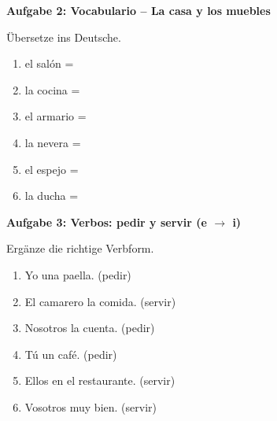 \documentclass[a4paper,11pt]{article}
\newcommand{\luecke}[1]{\underline{\hspace{#1}}}
\newcommand{\punktebox}[1]{\hfill\fbox{\small\textcolor{mittelgrau}{\_\_\_\,/\,#1}}}
\newenvironment{aufgabe}[2]{%
    \vspace{3mm}
    \noindent\textbf{\color{spanisch}Aufgabe #1: #2}
    \vspace{1mm}
    \par
}{\vspace{2mm}}
\begin{document}
\begin{aufgabe}{2}{Vocabulario -- La casa y los muebles \punktebox{6}}

Übersetze ins Deutsche.

\vspace{2mm}
\begin{multicols}{2}
\begin{enumerate}[itemsep=1mm]
    \item el salón = \luecke{3cm}
    \item la cocina = \luecke{3cm}
    \item el armario = \luecke{3cm}
    \item la nevera = \luecke{3cm}
    \item el espejo = \luecke{3cm}
    \item la ducha = \luecke{3cm}
\end{enumerate}
\end{multicols}
\end{aufgabe}


\begin{aufgabe}{3}{Verbos: pedir y servir (e $\rightarrow$ i) \punktebox{6}}

Ergänze die richtige Verbform.

\vspace{2mm}
\begin{enumerate}[itemsep=2mm]
    \item Yo \luecke{2.5cm} una paella. (pedir)
    \item El camarero \luecke{2.5cm} la comida. (servir)
    \item Nosotros \luecke{2.5cm} la cuenta. (pedir)
    \item Tú \luecke{2.5cm} un café. (pedir)
    \item Ellos \luecke{2.5cm} en el restaurante. (servir)
    \item Vosotros \luecke{2.5cm} muy bien. (servir)
\end{enumerate}
\end{aufgabe}

\end{document}
